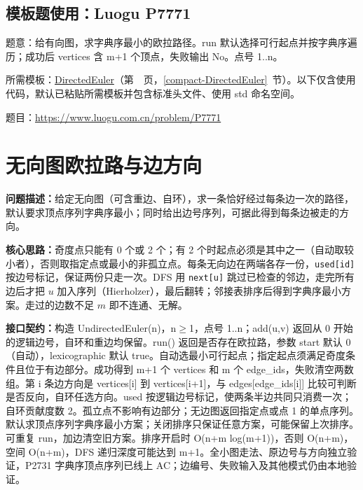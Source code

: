 \subsection*{模板题使用：Luogu P7771}

\label{usage-example-57}

题意：给有向图，求字典序最小的欧拉路径。run 默认选择可行起点并按字典序遍历；成功后 vertices 含 m+1 个顶点，失败输出 No。点号 1..n。

所需模板：\hyperref[compact-DirectedEuler]{DirectedEuler}（第~\pageref{compact-DirectedEuler}~页，\ref{compact-DirectedEuler}~节）。以下仅含使用代码，默认已粘贴所需模板并包含标准头文件、使用 std 命名空间。

题目：\url{https://www.luogu.com.cn/problem/P7771}



\Needspace{596pt}

\section{无向图欧拉路与边方向}\label{compact-UndirectedEuler}

\noindent\textbf{问题描述：}\allowbreak 给定无向图（可含重边、自环），求一条恰好经过每条边一次的路径，默认要求顶点序列字典序最小；同时给出边号序列，可据此得到每条边被走的方向。

\textbf{核心思路：}\allowbreak 奇度点只能有 0 个或 2 个；有 2 个时起点必须是其中之一（自动取较小者），否则取指定点或最小的非孤立点。每条无向边在两端各存一份，\texttt{used[id]} 按边号标记，保证两份只走一次。DFS 用 \texttt{next[u]} 跳过已检查的邻边，走完所有边后才把 $u$ 加入序列（Hierholzer），最后翻转；邻接表排序后得到字典序最小方案。走过的边数不足 $m$ 即不连通、无解。



{\sloppy{}\noindent\textbf{接口契约：}构造 UndirectedEuler(n)，n$\ge$1，点号 1..n；add(u,v) 返回从 0 开始的逻辑边号，自环和重边均保留。run() 返回是否存在欧拉路，参数 start 默认 0（自动），lexicographic 默认 true。自动选最小可行起点；指定起点须满足奇度条件且位于有边部分。成功得到 m+1 个 vertices 和 m 个 edge\_ids，失败清空两数组。第 i 条边方向是 vertices[i] 到 vertices[i+1]，与 edges[edge\_ids[i]] 比较可判断是否反向，自环任选方向。used 按逻辑边号标记，使两条半边共同只消费一次；自环贡献度数 2。孤立点不影响有边部分；无边图返回指定点或点 1 的单点序列。默认求顶点序列字典序最小方案；关闭排序只保证任意方案，可能保留上次排序。可重复 run，加边清空旧方案。排序开启时 O(n+m log(m+1))，否则 O(n+m)，空间 O(n+m)，DFS 递归深度可能达到 m+1。全小图走法、原边号与方向独立验证，P2731 字典序顶点序列已线上 AC；边编号、失败输入及其他模式仍由本地验证。\par}

